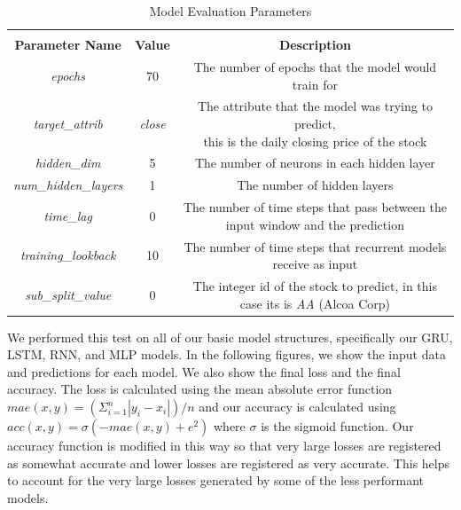 \documentclass{article}
\begin{document}
    \begin{table}[H]
        \begin{center}
            \caption{{Model Evaluation Parameters}}
            \label{tab:evalParams}
            \bgroup
            \def\arraystretch{1.2}
            \begin{tabular}{|c|c|c|}
                \hline\\
                \textbf{Parameter Name} & \textbf{Value} & \textbf{Description}\\
                \hline
                \textit{epochs} & 70 & The number of epochs that the model would train for\\
                \hline
                \textit{target\_attrib} & \textit{close} & \makecell{The attribute that the model was trying to predict,\\this is the daily closing price of the stock}\\
                \hline
                \textit{hidden\_dim} & 5 & The number of neurons in each hidden layer\\
                \hline
                \textit{num\_hidden\_layers} & 1 & The number of hidden layers\\
                \hline
                \textit{time\_lag} & 0 & The number of time steps that pass between the input window and the prediction\\
                \hline
                \textit{training\_lookback} & 10 & The number of time steps that recurrent models receive as input\\
                \hline
                \textit{sub\_split\_value} & 0 & The integer id of the stock to predict, in this case its is \textit{AA} (Alcoa Corp)\\
                \hline
            \end{tabular}
            \egroup
        \end{center}
    \end{table}

    We performed this test on all of our basic model structures, specifically our GRU, LSTM, RNN, and MLP models.
    In the following figures, we show the input data and predictions for each model.  We also show the final loss
    and the final accuracy.  The loss is calculated using the mean absolute error function
    $mae(x, y) = (\Sigma^n_{i=1} |y_i - x_i|) / n$ and our accuracy is calculated using
    $acc(x, y) = \sigma(-mae(x, y)+e^2)$ where $\sigma$ is the sigmoid function.  Our accuracy function is modified
    in this way so that very large losses are registered as somewhat accurate and lower losses are registered as
    very accurate.  This helps to account for the very large losses generated by some of the less performant models.
\end{document}
